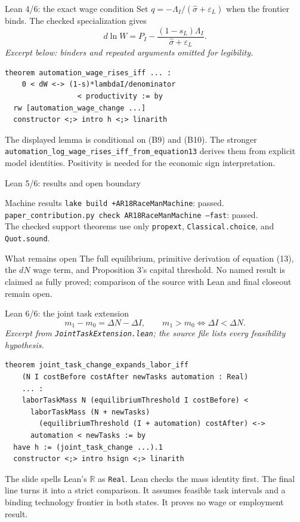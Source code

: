 \begin{frame}[fragile]{Lean 4/6: the exact wage condition}
Set $q=-\Lambda_I/(\widehat\sigma+\varepsilon_L)$ when the frontier binds. The checked specialization gives
\[d\ln W=P_I-\frac{(1-s_L)\Lambda_I}{\widehat\sigma+\varepsilon_L}.\]
\small\textit{Excerpt below: binders and repeated arguments omitted for legibility.}
\begin{lstlisting}
theorem automation_wage_rises_iff ... :
    0 < dW <-> (1-s)*lambdaI/denominator
                 < productivity := by
  rw [automation_wage_change ...]
  constructor <;> intro h <;> linarith
\end{lstlisting}
\vspace{.4em}
\small The displayed lemma is conditional on (B9) and (B10). The stronger \texttt{automation\_log\_wage\_rises\_iff\_from\_equation13} derives them from explicit model identities. Positivity is needed for the economic sign interpretation.
\end{frame}

\begin{frame}{Lean 5/6: results and open boundary}
\begin{block}{Machine results}
\texttt{lake build +AR18RaceManMachine}: passed.\\
\texttt{paper\_contribution.py check AR18RaceManMachine --fast}: passed.\\
The checked support theorems use only \texttt{propext}, \texttt{Classical.choice}, and \texttt{Quot.sound}.
\end{block}
\vspace{.4em}
\begin{alertblock}{What remains open}
The full equilibrium, primitive derivation of equation (13), the $dN$ wage term, and Proposition 3's capital threshold. No named result is claimed as fully proved; comparison of the source with Lean and final closeout remain open.
\end{alertblock}
\end{frame}

\begin{frame}[fragile]{Lean 6/6: the joint task extension}
\vspace{-.4em}
\small
\[m_1-m_0=\Delta N-\Delta I,\qquad m_1>m_0\iff\Delta I<\Delta N.\]
\vspace{-.4em}
\footnotesize\textit{Excerpt from \texttt{JointTaskExtension.lean}; the source file lists every feasibility hypothesis.}
\begin{lstlisting}
theorem joint_task_change_expands_labor_iff
    (N I costBefore costAfter newTasks automation : Real)
    ... :
    laborTaskMass N (equilibriumThreshold I costBefore) <
      laborTaskMass (N + newTasks)
        (equilibriumThreshold (I + automation) costAfter) <->
      automation < newTasks := by
  have h := (joint_task_change ...).1
  constructor <;> intro hsign <;> linarith
\end{lstlisting}
\vspace{-.4em}
\footnotesize The slide spells Lean's $\mathbb R$ as \texttt{Real}. Lean checks the mass identity first. The final line turns it into a strict comparison. It assumes feasible task intervals and a binding technology frontier in both states. It proves no wage or employment result.
\end{frame}
